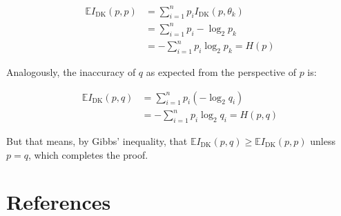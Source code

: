 \documentclass[
  letterpaper,
  DIV=11,
  numbers=noendperiod]{scrartcl}
\begin{document}
\begin{align*}
\mathbb{E}I_{\text{DK}}(p,p) & = \sum_{i =1}^n p_i I_{\text{DK}}(p, \theta_k) \\
& = \sum_{i =1}^n  p_i - \log_2 p_k \\
& = - \sum_{i =1}^n  p_i  \log_2 p_k = H(p)
\end{align*}

\noindent Analogously, the inaccuracy of \(q\) as expected from the
perspective of \(p\) is:

\begin{align*}
\mathbb{E}I_{\text{DK}}(p, q) & =   \sum_{i =1}^n p_i \left( - \log_2 q_i\right)\\
& = -  \sum_{i =1}^n p_i  \log_2 q_i = H(p,q)
\end{align*}

But that means, by Gibbs' inequality, that
\(\mathbb{E}I_{\text{DK}}(p,q) \geq \mathbb{E}I_{\text{DK}}(p,p)\)
unless \(p=q\), which completes the proof.

\hypertarget{references}{%
\section*{References}\label{references}}
\end{document}
